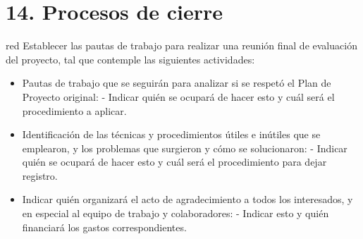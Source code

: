 \documentclass[
11pt, %
codirector, %
]{charter}
\begin{document}
\section{14. Procesos de cierre}    
\label{sec:cierre}

\begin{consigna}{red}
Establecer las pautas de trabajo para realizar una reunión final de evaluación del proyecto, tal que contemple las siguientes actividades:

\begin{itemize}
	\item Pautas de trabajo que se seguirán para analizar si se respetó el Plan de Proyecto original:
	 - Indicar quién se ocupará de hacer esto y cuál será el procedimiento a aplicar. 
	\item Identificación de las técnicas y procedimientos útiles e inútiles que se emplearon, y los problemas que surgieron y cómo se solucionaron:
	 - Indicar quién se ocupará de hacer esto y cuál será el procedimiento para dejar registro.
	\item Indicar quién organizará el acto de agradecimiento a todos los interesados, y en especial al equipo de trabajo y colaboradores:
	  - Indicar esto y quién financiará los gastos correspondientes.
\end{itemize}

\end{consigna}
\end{document}

